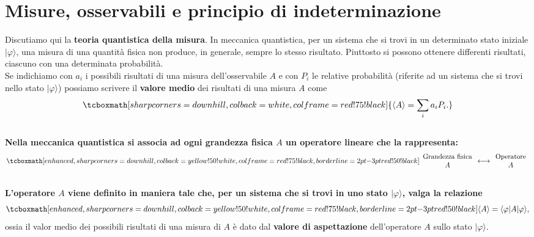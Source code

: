 \chapter[Misure e osservabili]{Misure, osservabili e principio di indeterminazione}
Discutiamo qui la \textbf{teoria quantistica della misura}. In meccanica quantistica, per un sistema che si trovi in un determinato stato iniziale $\vert \varphi \rangle$, una misura di una quantità fisica non produce, in generale, sempre lo stesso risultato. Piuttosto si possono ottenere differenti risultati, ciascuno con una determinata probabilità.\\

Se indichiamo con $a_i$ i possibili risultati di una misura dell'osservabile $A$ e con $P_i$ le relative probabilità (riferite ad un sistema che si trovi nello stato $\vert \varphi \rangle$) possiamo scrivere il \textbf{valore medio} dei risultati di una misura $A$ come
	\begin{equation}
		\tcboxmath[sharp corners=downhill ,colback=white,colframe=red!75!black]{
			\langle A \rangle = \sum _i a_i P_i.
			}
	\end{equation}
\\

\textbf{Nella meccanica quantistica si associa ad ogni grandezza fisica $A$ un operatore lineare che la rappresenta:}
	\begin{equation}
		\tcboxmath[enhanced,sharp corners=downhill ,colback=yellow!50!white,colframe=red!75!black, borderline={2pt}{-3pt}{red!50!black}]{
			\begin{array}{c}
			\textrm{Grandezza fisica}\\
			A
			\end{array}
			\longleftrightarrow
			\begin{array}{c}
			\textrm{Operatore}\\
			A
			\end{array}
			}
	\end{equation}
\\

\textbf{L'operatore $A$ viene definito in maniera tale che, per un sistema che si trovi in uno stato $\vert \varphi \rangle $, valga la relazione}
	\begin{equation}
		\tcboxmath[enhanced,sharp corners=downhill ,colback=yellow!50!white,colframe=red!75!black, borderline={2pt}{-3pt}{red!50!black}]{
			\langle A \rangle = \langle \varphi \vert A \vert \varphi \rangle,
			}
	\end{equation}
ossia il valor medio dei possibili risultati di una misura di $A$ è dato dal \textbf{valore di aspettazione} dell'operatore $A$ sullo stato $\vert \varphi \rangle$.\\

